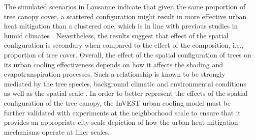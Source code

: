 \documentclass[10pt,letterpaper]{article}
\begin{document}
The simulated scenarios in Lausanne indicate that given the same proportion of tree canopy cover, a scattered configuration might result in more effective urban heat mitigation than a clustered one, which is in line with previous studies in humid climates \cite{kong2014effects,estoque2017effects,zhou2017effects,yu2018strong,nastran2019urban}.
Nevertheless, the results suggest that effect of the spatial configuration is secondary when compared to the effect of the composition, i.e., proportion of tree cover.
Overall, the effect of the spatial configuration of trees on its urban cooling effectiveness depends on how it affects the shading and evapotranspiration processes.
Such a relationship is known to be strongly mediated by the tree species, background climatic and environmental conditions as well as the spatial scale \cite{li2013relationship,estoque2017effects,zhou2017effects,jiao2017patch,yu2018strong,yan2019testing,wang2020significant,terfa2020spatial}.
In order to better represent the effects of the spatial configuration of the tree canopy, the InVEST urban cooling model must be further validated with experiments at the neighborhood scale to ensure that it provides an appropriate city-scale depiction of how the urban heat mitigation mechanisms operate at finer scales.
\end{document}
